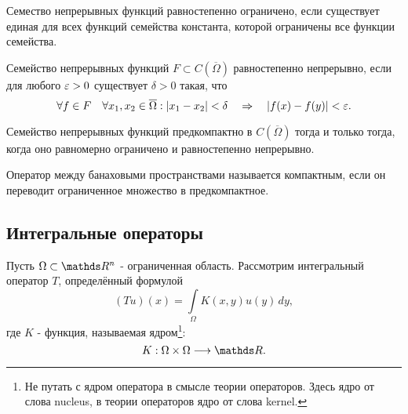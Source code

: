 \begin{definition}
Семество непрерывных функций равностепенно ограничено, если существует единая для всех функций семейства константа, которой ограничены все функции семейства.
\end{definition}

\begin{definition}
Семейство непрерывных функций $F \subset C(\overline{\Omega})$ равностепенно непрерывно, если для любого $\varepsilon >0$  существует $\delta >0$ такая, что
$$ \forall f \in F \quad \forall x_1,x_2 \in \overline{\Omega} : | x_1 - x_2 | < \delta \quad \Rightarrow \quad |f(x) - f(y)| < \varepsilon .$$ 
\end{definition}

\begin{theorem}
Семейство непрерывных функций предкомпактно в $C(\overline{\Omega})$ тогда и только тогда, когда оно равномерно ограничено и равностепенно непрерывно.
\end{theorem}

\begin{definition}
Оператор между банаховыми пространствами называется компактным, если он переводит ограниченное множество в предкомпактное.
\end{definition}

\subsection{Интегральные операторы}
Пусть $\Omega \subset \real^n$ - ограниченная область.
Рассмотрим интегральный оператор $T$, определённый формулой
$$ (Tu)(x) = \int \limits_\Omega K(x,y) u(y) \, dy,$$
где $K$ - функция, называемая ядром\footnote{Не путать с ядром оператора в смысле теории операторов. Здесь ядро от слова nucleus, в теории операторов ядро от слова kernel.}:
$$ K : \Omega \times \Omega \longrightarrow \real.$$

